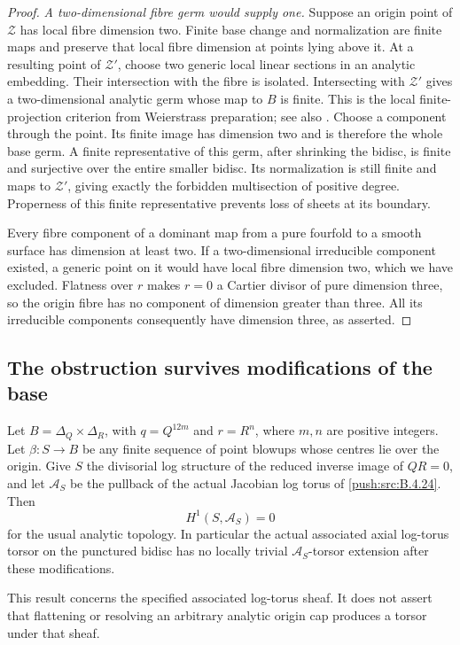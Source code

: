 \begin{proof}
\emph{A two-dimensional fibre germ would supply one.}
Suppose an origin point of $\mathcal Z$ has local
fibre dimension two. Finite base change and
normalization are finite maps and preserve that
local fibre dimension at points lying above it.
At a resulting point of $\mathcal Z'$, choose
two generic local linear sections in an analytic
embedding. Their intersection with the fibre is
isolated. Intersecting with $\mathcal Z'$ gives
a two-dimensional analytic germ whose map to
$B$ is finite. This is the local finite-projection
criterion from Weierstrass preparation; see also
\citet[Chapter II, Sections 7--8]{Demailly2012E}.
Choose a component through the point. Its finite
image has dimension two and is therefore the
whole base germ. A finite representative of this
germ, after shrinking the bidisc, is finite and
surjective over the entire smaller bidisc. Its
normalization is still finite and maps to
$\mathcal Z'$, giving exactly the forbidden
multisection of positive degree. Properness of
this finite representative prevents loss of
sheets at its boundary.

Every fibre component of a dominant map from a
pure fourfold to a smooth surface has dimension
at least two. If a two-dimensional irreducible
component existed, a generic point on it would
have local fibre dimension two, which we have
excluded. Flatness over $r$ makes $r=0$ a
Cartier divisor of pure dimension three, so
the origin fibre has no component of dimension
greater than three. All its irreducible
components consequently have dimension three,
as asserted.
\end{proof}

\subsection{The obstruction survives modifications of the base}

\begin{proposition}\label{push:src:B.4.27}
\label{push:B427}
Let $B=\Delta_Q\times\Delta_R$, with
$q=Q^{12m}$ and $r=R^n$, where $m,n$ are positive
integers. Let $\beta:S\to B$ be any finite sequence
of point blowups whose centres lie over the origin.
Give $S$ the divisorial log structure of the reduced
inverse image of $QR=0$, and let $\mathcal A_S$ be
the pullback of the actual Jacobian log torus of
\ref{push:src:B.4.24}. Then
\[
 H^1(S,\mathcal A_S)=0
 \tag{B.4.27.1}
\]
for the usual analytic topology. In particular the
actual associated axial log-torus torsor on the
punctured bidisc has no locally trivial
$\mathcal A_S$-torsor extension after these
modifications.

This result concerns the specified associated
log-torus sheaf. It does not assert that flattening
or resolving an arbitrary analytic origin cap
produces a torsor under that sheaf.
\end{proposition}


